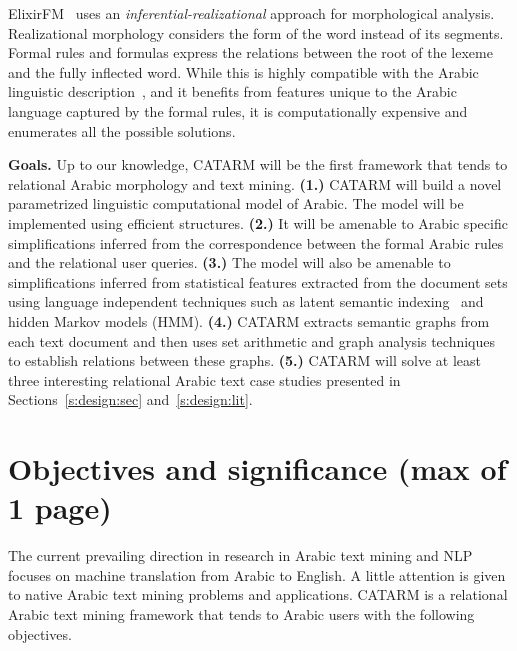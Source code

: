 \documentclass[12pt]{article}
\newcommand{\noTrRL}[1]{\transfalse\RL{#1}\transtrue}
\begin{document}
ElixirFM~\cite{Otakar:07} uses an {\em inferential-realizational}
approach for morphological analysis. 
Realizational morphology considers the form of the word 
\noTrRL{.sarf}  instead of its segments. 
Formal rules and formulas express the relations between 
the root of the lexeme and the fully inflected word. 
While this is highly compatible with the Arabic linguistic 
description~\cite{Badawi:04},
and it benefits from features unique to the Arabic language
captured by the formal rules, 
it is computationally expensive and enumerates all the possible
solutions. 

{\bf Goals.} Up to our knowledge, CATARM will be the 
first framework that tends to relational Arabic morphology 
and text mining. 
{\bf (1.)} CATARM will build a novel parametrized linguistic 
computational model of Arabic. 
The model will be implemented using efficient structures. 
 {\bf (2.)} It will be amenable to Arabic specific simplifications 
inferred from the correspondence between the formal Arabic rules
and the relational user queries.
{\bf (3.)} The model will also be amenable to simplifications 
inferred from statistical features extracted from the document 
sets using language independent techniques such as latent semantic 
indexing~\cite{LSI89} and hidden Markov models (HMM).
{\bf (4.)} CATARM extracts semantic graphs from each text 
document and then uses set arithmetic and graph analysis techniques
to establish relations between these graphs. {\bf (5.)} CATARM will 
solve at least three interesting relational Arabic text case studies 
presented in Sections~\ref{s:design:sec} and~\ref{s:design:lit}.

\pagebreak

\section{Objectives and significance (max of 1 page) } 
\label{s:objectives}

The current prevailing direction in research 
in Arabic text mining and NLP focuses on machine translation from 
Arabic to English. 
A little attention is given to native Arabic text mining 
problems and applications. 
CATARM is a relational Arabic text mining 
framework that tends to Arabic users 
with the following objectives.
\end{document}
